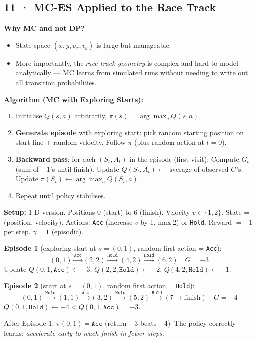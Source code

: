 \documentclass[11pt,a4paper]{article}
\begin{document}
\subsection*{11 · MC-ES Applied to the Race Track}

\textbf{Why MC and not DP?}
\begin{itemize}
  \item State space $(x, y, v_x, v_y)$ is large but manageable.
  \item More importantly, the \emph{race track geometry} is complex and hard to model analytically
    — MC learns from simulated runs without needing to write out all transition probabilities.
\end{itemize}

\textbf{Algorithm (MC with Exploring Starts):}
\begin{enumerate}
  \item Initialise $Q(s,a)$ arbitrarily, $\pi(s) = \arg\max_a Q(s,a)$.
  \item \textbf{Generate episode} with exploring start:
        pick random starting position on start line + random velocity. Follow $\pi$ (plus random action at $t=0$).
  \item \textbf{Backward pass}: for each $(S_t, A_t)$ in the episode (first-visit):
        Compute $G_t$ (sum of $-1$'s until finish). Update $Q(S_t, A_t) \leftarrow$ average of observed $G$'s.
        Update $\pi(S_t) \leftarrow \arg\max_a Q(S_t, a)$.
  \item Repeat until policy stabilises.
\end{enumerate}

\begin{tcolorbox}[exam={Worked Trace — Simplified 1-D Race Track}]
\textbf{Setup:} 1-D version. Positions $0$ (start) to $6$ (finish). Velocity $v \in \{1, 2\}$.
State = (position, velocity). Actions: \texttt{Acc} (increase $v$ by 1, max 2) or \texttt{Hold}.
Reward $= -1$ per step. $\gamma = 1$ (episodic).

\medskip
\textbf{Episode 1} (exploring start at $s=(0,1)$, random first action = \texttt{Acc}):
\[
  (0,1) \xrightarrow{\texttt{Acc}} (2,2) \xrightarrow{\texttt{Hold}} (4,2)
  \xrightarrow{\texttt{Hold}} (6,2) \quad G = -3
\]
Update $Q(0,1,\texttt{Acc}) \leftarrow -3$. $Q(2,2,\texttt{Hold}) \leftarrow -2$.
$Q(4,2,\texttt{Hold}) \leftarrow -1$.

\medskip
\textbf{Episode 2} (start at $s=(0,1)$, random first action = \texttt{Hold}):
\[
  (0,1) \xrightarrow{\texttt{Hold}} (1,1) \xrightarrow{\texttt{Acc}} (3,2)
  \xrightarrow{\texttt{Hold}} (5,2) \xrightarrow{\texttt{Hold}} (7\to \text{finish}) \quad G = -4
\]
$Q(0,1,\texttt{Hold}) \leftarrow -4 < Q(0,1,\texttt{Acc}) = -3$.

\medskip
After Episode 1: $\pi(0,1) = \texttt{Acc}$ (return $-3$ beats $-4$).
The policy correctly learns: \emph{accelerate early to reach finish in fewer steps}.
\end{tcolorbox}
\end{document}
